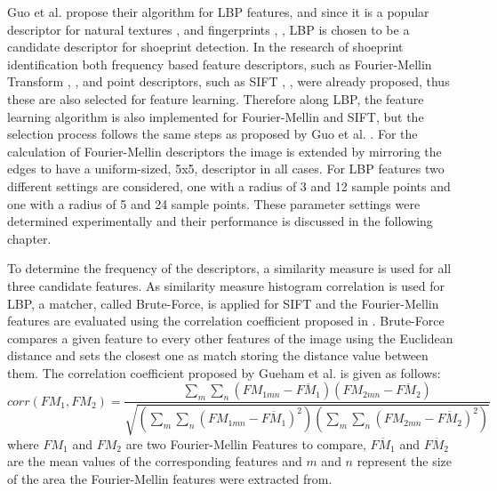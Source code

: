 \documentclass[draft,final]{vutinfth} %
\begin{document}
\par
Guo et al. \cite{guo2012discriminative} propose their algorithm for LBP features, and since it is a popular descriptor for natural textures \cite{hong2014combining}, \cite{ahonen2009rotation} and fingerprints \cite{wang2013pixel}, \cite{rida2018palmprint}, LBP is chosen to be a candidate descriptor for shoeprint detection.
In the research of shoeprint identification both frequency based feature descriptors, such as Fourier-Mellin Transform \cite{wu2019crime}, \cite{gueham2008automatic}, and point descriptors, such as SIFT \cite{nibouche2009rotation}, \cite{richetelli2017classification}, were already proposed, thus these are also selected for feature learning.
Therefore along LBP, the feature learning algorithm is also implemented for Fourier-Mellin and SIFT, but the selection process follows the same steps as proposed by Guo et al. \cite{guo2012discriminative}.
For the calculation of Fourier-Mellin descriptors the image is extended by mirroring the edges to have a uniform-sized, 5x5, descriptor in all cases.
For LBP features two different settings are considered, one with a radius of 3 and 12 sample points and one with a radius of 5 and 24 sample points.
These parameter settings were determined experimentally and their performance is discussed in the following chapter.
\par
 To determine the frequency of the descriptors, a similarity measure is used for all three candidate features. 
As similarity measure histogram correlation is used for LBP, a matcher, called Brute-Force, is applied for SIFT and the Fourier-Mellin features are evaluated using the correlation coefficient proposed  in \cite{gueham2008automatic}.
Brute-Force compares a given feature to every other features of the image using the Euclidean distance and sets the closest one as match storing the distance value between them.
The correlation coefficient proposed by Gueham et al. \cite{gueham2008automatic} is given as follows:
\begin{equation}
corr(FM_{1},FM_{2}) = \frac{\sum\limits_{m}\sum\limits_{n}(FM_{1mn}-\overline{FM_{1}})(FM_{2mn}-\overline{FM_{2}})}{\sqrt{(\sum\limits_{m}\sum\limits_{n}(FM_{1mn}-\overline{FM_{1}})^2)(\sum\limits_{m}\sum\limits_{n}(FM_{2mn}-\overline{FM_{2}})^2)}}  
\label{FMcorr}
\end{equation}
where $FM_{1}$ and $FM_{2}$ are two Fourier-Mellin Features to compare, $\overline{FM_{1}}$ and $\overline{FM_{2}}$ are the mean values of the corresponding features and $m$ and $n$ represent the size of the area the Fourier-Mellin features were extracted from.
\end{document}
